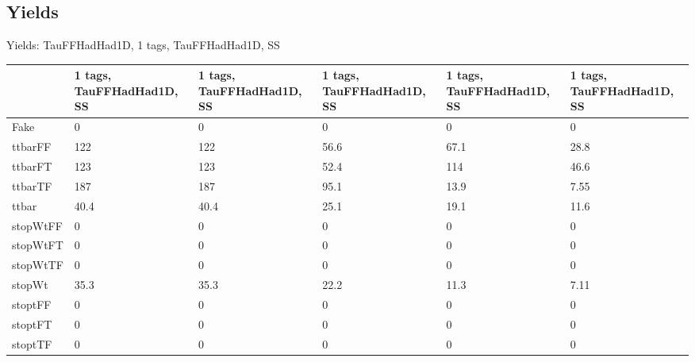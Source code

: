 
\subsection{Yields}

\begin{frame}{Yields: TauFFHadHad1D, 1 tags, TauFFHadHad1D, SS}
\begin{center}
  \begin{tabular}{l| >{\centering\let\newline\\\arraybackslash\hspace{0pt}}m{1.4cm}| >{\centering\let\newline\\\arraybackslash\hspace{0pt}}m{1.4cm}| >{\centering\let\newline\\\arraybackslash\hspace{0pt}}m{1.4cm}| >{\centering\let\newline\\\arraybackslash\hspace{0pt}}m{1.4cm}| >{\centering\let\newline\\\arraybackslash\hspace{0pt}}m{1.4cm}}
    & 1 tags, TauFFHadHad1D, SS & 1 tags, TauFFHadHad1D, SS & 1 tags, TauFFHadHad1D, SS & 1 tags, TauFFHadHad1D, SS & 1 tags, TauFFHadHad1D, SS \\
 \hline \hline
    Fake& 0 & 0 & 0 & 0 & 0 \\
 \hline
    ttbarFF& 122 & 122 & 56.6 & 67.1 & 28.8 \\
 \hline
    ttbarFT& 123 & 123 & 52.4 & 114 & 46.6 \\
 \hline
    ttbarTF& 187 & 187 & 95.1 & 13.9 & 7.55 \\
 \hline
    ttbar& 40.4 & 40.4 & 25.1 & 19.1 & 11.6 \\
 \hline
    stopWtFF& 0 & 0 & 0 & 0 & 0 \\
 \hline
    stopWtFT& 0 & 0 & 0 & 0 & 0 \\
 \hline
    stopWtTF& 0 & 0 & 0 & 0 & 0 \\
 \hline
    stopWt& 35.3 & 35.3 & 22.2 & 11.3 & 7.11 \\
 \hline
    stoptFF& 0 & 0 & 0 & 0 & 0 \\
 \hline
    stoptFT& 0 & 0 & 0 & 0 & 0 \\
 \hline
    stoptTF& 0 & 0 & 0 & 0 & 0 \\

\end{tabular}
\end{center}
\end{frame}
